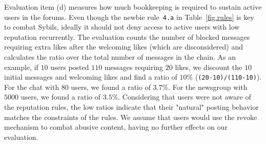 \documentclass[12pt]{article}
\newcommand{\code}[1]  {\texttt{\footnotesize{#1}}}
\begin{document}
Evaluation item (d) measures how much bookkeeping is required to sustain active
users in the forums.
Even though the newbie rule~\code{4.a} in Table~\ref{fig.rules} is key to
combat Sybils, ideally it should not deny access to active users with low
reputation recurrently.
%
The evaluation counts the number of blocked messages requiring extra likes
after the welcoming likes (which are disconsidered) and calculates the ratio
over the total number of messages in the chain.
As an example, if $10$ users posted $110$ messages requiring $20$ likes, we
discount the $10$ initial messages and welcoming likes and find a ratio of
$10\%$ (\code{(20-10)/(110-10)}).
%
For the chat with $80$ users, we found a ratio of $3.7\%$.
For the newsgroup with $5000$ users, we found a ratio of $3.5\%$.
%
Considering that users were not aware of the reputation rules, the low ratios
indicate that their "natural" posting behavior matches the constraints of the
rules.
%
We assume that users would use the revoke mechanism to combat abusive content,
having no further effects on our evaluation.
\end{document}

